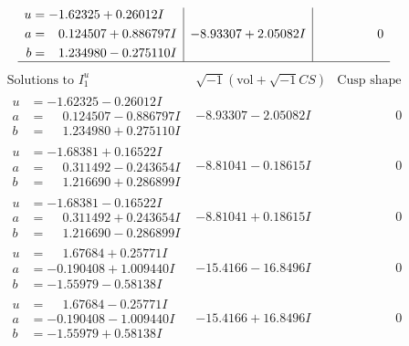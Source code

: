 \documentclass[1p]{elsarticle_modified}
\theoremstyle{definition}
\newcommand{\I}{\sqrt{-1}}
\begin{document}
$$\begin{array}{c|c|c}
\begin{aligned}
u &= -1.62325 + 0.26012 I \\
a &= \phantom{-}0.124507 + 0.886797 I \\
b &= \phantom{-}1.234980 - 0.275110 I\end{aligned}
 & -8.93307 + 2.05082 I & \phantom{-0.000000 } 0\\
 \hline 
 \end{array}$$\newpage$$\begin{array}{c|c|c}  
\text{Solutions to }I^u_{1}& \I (\text{vol} + \sqrt{-1}CS) & \text{Cusp shape}\\
 \hline 
\begin{aligned}
u &= -1.62325 - 0.26012 I \\
a &= \phantom{-}0.124507 - 0.886797 I \\
b &= \phantom{-}1.234980 + 0.275110 I\end{aligned}
 & -8.93307 - 2.05082 I & \phantom{-0.000000 } 0 \\ \hline\begin{aligned}
u &= -1.68381 + 0.16522 I \\
a &= \phantom{-}0.311492 - 0.243654 I \\
b &= \phantom{-}1.216690 + 0.286899 I\end{aligned}
 & -8.81041 - 0.18615 I & \phantom{-0.000000 } 0 \\ \hline\begin{aligned}
u &= -1.68381 - 0.16522 I \\
a &= \phantom{-}0.311492 + 0.243654 I \\
b &= \phantom{-}1.216690 - 0.286899 I\end{aligned}
 & -8.81041 + 0.18615 I & \phantom{-0.000000 } 0 \\ \hline\begin{aligned}
u &= \phantom{-}1.67684 + 0.25771 I \\
a &= -0.190408 + 1.009440 I \\
b &= -1.55979 - 0.58138 I\end{aligned}
 & -15.4166 - 16.8496 I & \phantom{-0.000000 } 0 \\ \hline\begin{aligned}
u &= \phantom{-}1.67684 - 0.25771 I \\
a &= -0.190408 - 1.009440 I \\
b &= -1.55979 + 0.58138 I\end{aligned}
 & -15.4166 + 16.8496 I & \phantom{-0.000000 } 0 \\ \hline\begin{aligned}

\end{aligned}
\end{array}$$
\end{document}
